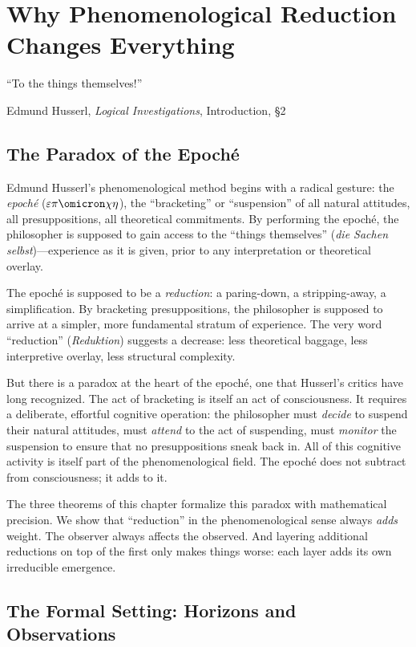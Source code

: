 \chapter{Why Phenomenological Reduction Changes Everything}
\label{ch:phenomenological-reduction}

\epigraph{``To the things themselves!''}
{Edmund Husserl, \textit{Logical Investigations}, Introduction, \S2}

\section{The Paradox of the Epoch\'e}

Edmund Husserl's phenomenological method begins with a radical
gesture: the \emph{epoch\'e} ($\varepsilon\pi\omicron\chi\eta$), the
``bracketing'' or ``suspension'' of all natural attitudes, all
presuppositions, all theoretical commitments. By performing the
epoch\'e, the philosopher is supposed to gain access to the ``things
themselves'' (\textit{die Sachen selbst})---experience as it is
given, prior to any interpretation or theoretical overlay.

The epoch\'e is supposed to be a \emph{reduction}: a paring-down, a
stripping-away, a simplification. By bracketing presuppositions, the
philosopher is supposed to arrive at a simpler, more fundamental
stratum of experience. The very word ``reduction'' (\textit{Reduktion})
suggests a decrease: less theoretical baggage, less interpretive
overlay, less structural complexity.

But there is a paradox at the heart of the epoch\'e, one that Husserl's
critics have long recognized. The act of bracketing is itself an act of
consciousness. It requires a deliberate, effortful cognitive operation:
the philosopher must \emph{decide} to suspend their natural attitudes,
must \emph{attend} to the act of suspending, must \emph{monitor} the
suspension to ensure that no presuppositions sneak back in. All of this
cognitive activity is itself part of the phenomenological field. The
epoch\'e does not subtract from consciousness; it adds to it.

The three theorems of this chapter formalize this paradox with
mathematical precision. We show that ``reduction'' in the
phenomenological sense always \emph{adds} weight. The observer always
affects the observed. And layering additional reductions on top of the
first only makes things worse: each layer adds its own irreducible
emergence.

\section{The Formal Setting: Horizons and Observations}

